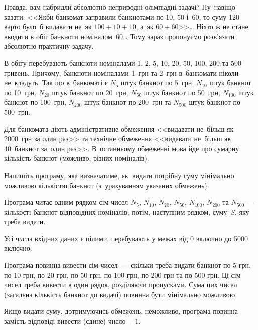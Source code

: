 ﻿Правда, вам набридли абсолютно неприродні олімпіадні задачі? 
Ну~навіщо казати: <<Якби банкомат заправили банкнотами по 10, 50 і~60, 
то суму 120 варто було~б видавати не~як $100+10+10$, 
а~як $60+60$>>\dots{}
Ніхто ж не стане вводити в обіг банкноти номіналом~60\dots{}
Тому зараз пропонуємо розв'язати абсолютно практичну задачу.

В обігу перебувають банкноти номіналами 1, 2, 5, 10, 20, 50, 100, 200 та 500 гривень. 
Причому, банкноти номіналами 1~грн та 2~грн в~банкомати ніколи не~кладуть. 
Так що в~банкоматі є 
$N_5$ штук банкнот по 5~грн, 
$N_{10}$ штук банкнот по 10~грн, 
$N_{20}$ штук банкнот по 20~грн, 
$N_{50}$ штук банкнот по 50~грн, 
$N_{100}$ штук банкнот по 100~грн, 
$N_{200}$ штук банкнот по 200~грн та
$N_{500}$ штук банкнот по 500~грн. 

Для банкомата діють адміністративне обмеження 
<<видавати не~більш як 2000~грн за один раз>> 
та технічне обмеження 
<<видавати не~більш як 40~банкнот за~один раз>>. 
В~останньому обмеженні мова йде про сумарну 
кількість банкнот (можливо, різних номіналів).

Напишіть програму, яка визначатиме, як~видати 
потрібну суму мінімально можливою кількістю банкнот 
(з~урахуванням указаних обмежень).

\InputFile
Програма читає одним рядком сім чисел 
$N_5$, $N_{10}$, $N_{20}$, 
$N_{50}$, $N_{100}$, $N_{200}$ та $N_{500}$ --- кількості банкнот відповідних номіналів;
потім, наступним рядком, суму~$S$, яку треба видати.

Усі ч{\it и}сла вхідних даних є цілими, перебувають у межах від 0 включно до 5000 включно.

\OutputFile
Програма повинна вивести сім чисел~--- скільки треба видати банкнот 
по 5 грн, 
по 10 грн, 
по 20 грн, 
по 50 грн, 
по 100 грн, 
по 200 грн та
по 500 грн.
Ці сім чисел треба вивести в один рядок, розділяючи пропусками. 
Сума цих чисел (загальна кількість банкнот до видачі) повинна бути мінімально можливою. 

Якщо видати суму, дотримуючись обмежень, неможливо, програма повинна замість відповіді вивести (єдине) число~$-1$.

\Examples
\begin{example}%
%
%
\end{example}
